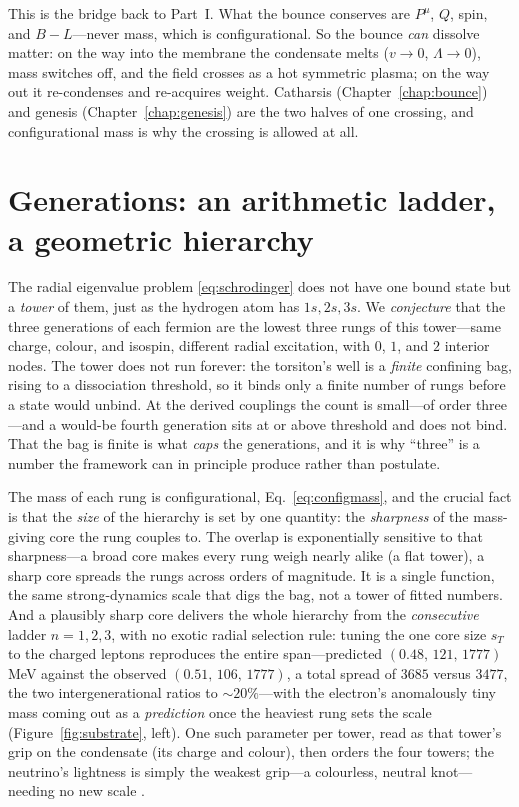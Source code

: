 This is the bridge back to Part~I. What the bounce conserves are $P^\mu$, $Q$, spin, and
$B\!-\!L$---never mass, which is configurational. So the bounce \emph{can} dissolve matter: on
the way into the membrane the condensate melts ($v\to0$, $\Lambda\to0$), mass switches off, and
the field crosses as a hot symmetric plasma; on the way out it re-condenses and re-acquires
weight. Catharsis (Chapter~\ref{chap:bounce}) and genesis (Chapter~\ref{chap:genesis}) are the
two halves of one crossing, and configurational mass is why the crossing is allowed at all.

\section{Generations: an arithmetic ladder, a geometric hierarchy}
\label{sec:generations}

The radial eigenvalue problem \eqref{eq:schrodinger} does not have one bound state but a
\emph{tower} of them, just as the hydrogen atom has $1s,2s,3s$. We \emph{conjecture} that the three
generations of each fermion are the lowest three rungs of this tower---same charge, colour, and
isospin, different radial excitation, with $0$, $1$, and $2$ interior nodes. The tower does not run
forever: the torsiton's well is a \emph{finite} confining bag, rising to a dissociation threshold, so
it binds only a finite number of rungs before a state would unbind. At the derived couplings the count
is small---of order three---and a would-be fourth generation sits at or above threshold and does not
bind. That the bag is finite is what \emph{caps} the generations, and it is why ``three'' is a number
the framework can in principle produce rather than postulate.

The mass of each rung is configurational, Eq.~\eqref{eq:configmass}, and the crucial fact is that the
\emph{size} of the hierarchy is set by one quantity: the \emph{sharpness} of the mass-giving core the
rung couples to. The overlap is exponentially sensitive to that sharpness---a broad core makes every
rung weigh nearly alike (a flat tower), a sharp core spreads the rungs across orders of magnitude. It
is a single function, the same strong-dynamics scale that digs the bag, not a tower of fitted numbers.
And a plausibly sharp core delivers the whole hierarchy from the \emph{consecutive} ladder $n=1,2,3$,
with no exotic radial selection rule: tuning the one core size $s_T$ to the charged leptons reproduces
the entire span---predicted $(0.48,\,121,\,1777)\,$MeV against the observed $(0.51,\,106,\,1777)$, a
total spread of $3685$ versus $3477$, the two intergenerational ratios to $\sim\!20\%$---with the
electron's anomalously tiny mass coming out as a \emph{prediction} once the heaviest rung sets the
scale (Figure~\ref{fig:substrate}, left). One such parameter per tower, read as that tower's grip on
the condensate (its charge and colour), then orders the four towers; the neutrino's lightness is
simply the weakest grip---a colourless, neutral knot---needing no new scale \citep{koide1983}.

